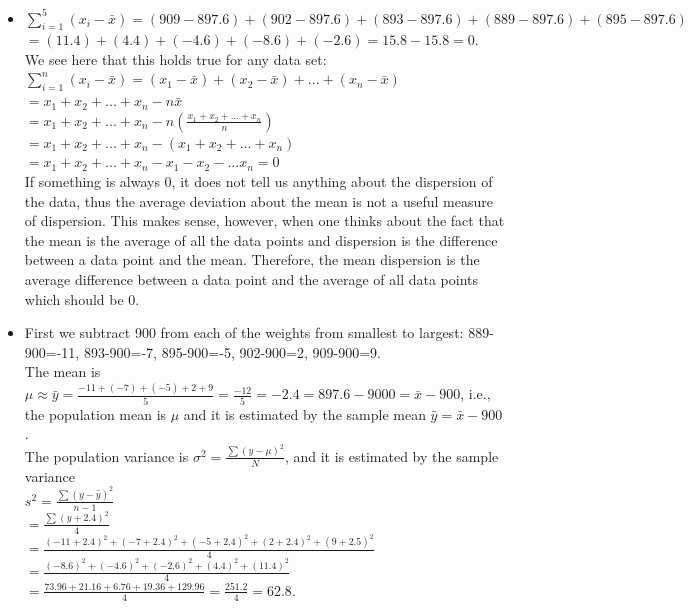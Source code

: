 \documentclass[12pt]{article}
\begin{document}
\begin{enumerate}
\begin{itemize}
The coefficient of variation of slaughter weight is $cv=\frac{\sigma}{\mu}$, and it is estimated by $\hat{cv}=\frac{s}{\bar{x}}=\frac{\sqrt{62.8}}{897.6}=0.0088$.
\item[b.]  $\sum_{i=1}^5(x_i-\bar{x})=(909-897.6) + (902-897.6) + (893-897.6) +(889-897.6) + (895-897.6) $\\
$=(11.4) + (4.4) + (-4.6) + (-8.6) + (-2.6) = 15.8-15.8 = 0. $\\
 We see here that this holds true for any data set:\\
  $\sum_{i=1}^n(x_i-\bar{x})=(x_1-\bar{x})+(x_2-\bar{x})+...+(x_n-\bar{x})$\\
  $=x_1+x_2+...+x_n-n\bar{x}$\\
  $=x_1+x_2+...+x_n-n\left(\frac{x_1+x_2+...+x_n}{n}\right)$\\
  $=x_1+x_2+...+x_n-(x_1+x_2+...+x_n)$\\
  $=x_1+x_2+...+x_n-x_1-x_2-...x_n=0$\\
  If something is always 0, it does not tell us anything about the dispersion of the data, thus the average deviation about the mean is not a useful measure of dispersion. This makes sense, however, when one thinks about the fact that the mean is the average of all the data points and dispersion is the difference between a data point and the mean. Therefore, the mean dispersion is the average difference between a data point and the average of all data points which should be 0.
\item[c.]  First we subtract 900 from each of the weights from smallest to largest: 889-900=-11, 893-900=-7, 895-900=-5, 902-900=2, 909-900=9. \\
The mean is $\mu\approx\bar{y}=\frac{-11 +(-7) +(-5) + 2 + 9 }{5}=\frac{-12}{5}=-2.4=897.6-9000=\bar{x}-900$,  i.e., the population mean is $\mu$ and it is estimated by the sample mean $\bar{y}=\bar{x}-900$.\\
The population variance is $\sigma^2=\frac{\sum(y-\mu)^2}{N}$, and it is estimated by the sample variance\\
$s^2=\frac{\sum(y-\hat{y})^2}{n-1}$\\
$=\frac{\sum(y+2.4)^2}{4}$\\
$=\frac{(-11 + 2.4)^2 + (-7 + 2.4)^2 + (-5 + 2.4)^2 + (2 + 2.4)^2 + (9 + 2.5)^2 }{4}$\\
$=\frac{(-8.6)^2 + (-4.6)^2 + (-2.6)^2 + (4.4)^2 + (11.4)^2}{4}$\\
$=\frac{73.96 + 21.16 + 6.76 + 19.36 + 129.96}{4}=\frac{251.2}{4}=62.8$.\\

\end{itemize}
\end{enumerate}
\end{document}
